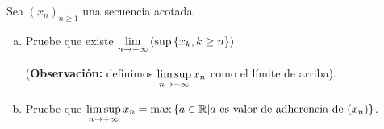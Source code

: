 
Sea $(x_n)_{n\geq 1}$ una secuencia acotada.

\begin{enumerate}[a)]

	\item Pruebe que existe $\limite{n}{\left(\sup\set{x_k,k\geq n}\right)}$

	(\textbf{Observación:} definimos $\limitesuperior{n}{x_n}$ como el límite de arriba).

	\item Pruebe que $\limitesuperior{n}{x_n} = \max\set{a\in\R | a\text{ es valor de adherencia de } (x_n)}$.

\end{enumerate}